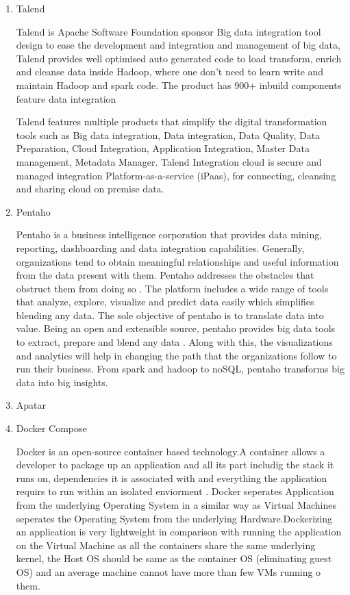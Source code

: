 \begin{enumerate}
\item {} 
Talend

Talend is Apache Software Foundation sponsor Big data integration
tool design to ease the development and integration and management
of big data, Talend provides well optimised auto generated code to
load transform, enrich and cleanse data inside Hadoop, where one
don’t need to learn write and maintain Hadoop and spark code.  The
product has 900+ inbuild components feature data integration

Talend features multiple products that simplify the digital
transformation tools such as Big data integration, Data
integration, Data Quality, Data Preparation, Cloud Integration,
Application Integration, Master Data management, Metadata Manager.
Talend Integration cloud is secure and managed integration
Platform-as-a-service (iPaas), for connecting, cleansing and
sharing cloud on premise data.

\item {} 
Pentaho

Pentaho is a business intelligence corporation that provides data
mining, reporting, dashboarding and data integration
capabilities. Generally, organizations tend to obtain meaningful
relationships and useful information from the data present with
them. Pentaho addresses the obstacles that obstruct them from
doing so \label{\detokenize{i524/technologies:id58}}{\hyperref[\detokenize{i524/technologies:pent1}]{\sphinxcrossref{{[}50{]}}}}. The platform includes a wide range of
tools that analyze, explore, visualize and predict data easily
which simplifies blending any data. The sole objective of pentaho
is to translate data into value. Being an open and extensible
source, pentaho provides big data tools to extract, prepare and
blend any data \label{\detokenize{i524/technologies:id59}}{\hyperref[\detokenize{i524/technologies:pent2}]{\sphinxcrossref{{[}51{]}}}}. Along with this, the visualizations
and analytics will help in changing the path that the
organizations follow to run their business. From spark and hadoop
to noSQL, pentaho transforms big data into big insights.

\item {} 
Apatar

\item {} 
Docker Compose

Docker is an open-source container based technology.A container
allows a developer to package up an application and all its part
includig the stack it runs on, dependencies it is associated with
and everything the application requirs to run within an isolated
enviorment . Docker seperates Application from the underlying
Operating System in a similar way as Virtual Machines seperates
the Operating System from the underlying Hardware.Dockerizing an
application is very lightweight in comparison with running the
application on the Virtual Machine as all the containers share the
same underlying kernel, the Host OS should be same as the
container OS (eliminating guest OS) and an average machine cannot
have more than few VMs running o them.


\end{enumerate}
